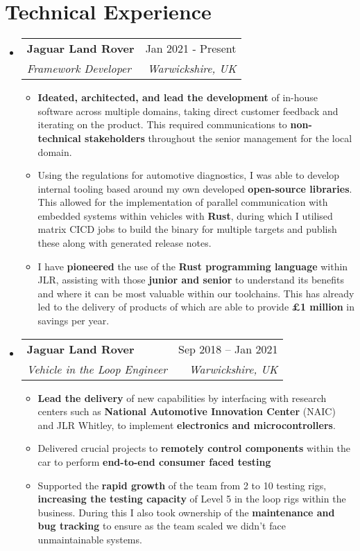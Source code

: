 \documentclass[letterpaper,11pt]{article}
\makeatletter
\newcommand{\resumeItem}[1]{
  \item\small{
    {#1 \vspace{-2pt}}
  }
}
\newcommand{\resumeSubheading}[4]{
  \vspace{-2pt}\item
    \begin{tabular*}{0.97\textwidth}[t]{l@{\extracolsep{\fill}}r}
      \textbf{#1} & #2 \\
      \textit{\small#3} & \textit{\small #4} \\
    \end{tabular*}\vspace{-7pt}
}
\newcommand{\resumeSubHeadingListStart}{\begin{itemize}[leftmargin=0.15in, label={}]}
\newcommand{\resumeSubHeadingListEnd}{\end{itemize}}
\newcommand{\resumeItemListStart}{\begin{itemize}}
\newcommand{\resumeItemListEnd}{\end{itemize}\vspace{-5pt}}
\makeatother
\begin{document}
\section{Technical Experience}
  \resumeSubHeadingListStart
    \resumeSubheading
      {Jaguar Land Rover}{Jan 2021 - Present}
      {Framework Developer}{Warwickshire, UK}
      \resumeItemListStart
        \resumeItem{\textbf{Ideated, architected, and lead the development} of in-house software across multiple domains, taking direct customer feedback and iterating on the product. This required communications to \textbf{non-technical stakeholders} throughout the senior management for the local domain.}
        \resumeItem{Using the regulations for automotive diagnostics, I was able to develop internal tooling based around my own developed \textbf{open-source libraries}. This allowed for the implementation of parallel communication with embedded systems within vehicles with \textbf{Rust}, during which I utilised matrix CICD jobs to build the binary for multiple targets and publish these along with generated release notes.}
        \resumeItem{I have \textbf{pioneered} the use of the \textbf{Rust programming language} within JLR, assisting with those \textbf{junior and senior} to understand its benefits and where it can be most valuable within our toolchains. This has already led to the delivery of products of which are able to provide \textbf{£1 million} in savings per year.}
      \resumeItemListEnd
    \resumeSubheading
      {Jaguar Land Rover}{Sep 2018 -- Jan 2021}
      {Vehicle in the Loop Engineer}{Warwickshire, UK}
      \resumeItemListStart
        \resumeItem{\textbf{Lead the delivery} of new capabilities by interfacing with research centers such as \textbf{National Automotive Innovation Center} (NAIC) and JLR Whitley, to implement \textbf{electronics and microcontrollers}.}
        \resumeItem{Delivered crucial projects to \textbf{remotely control components} within the car to perform \textbf{end-to-end consumer faced testing}}
        \resumeItem{Supported the \textbf{rapid growth} of the team from 2 to 10 testing rigs, \textbf{increasing the testing capacity} of Level 5 in the loop rigs within the business. During this I also took ownership of the \textbf{maintenance and bug tracking} to ensure as the team scaled we didn't face unmaintainable systems.}
      \resumeItemListEnd
  \resumeSubHeadingListEnd
\end{document}
